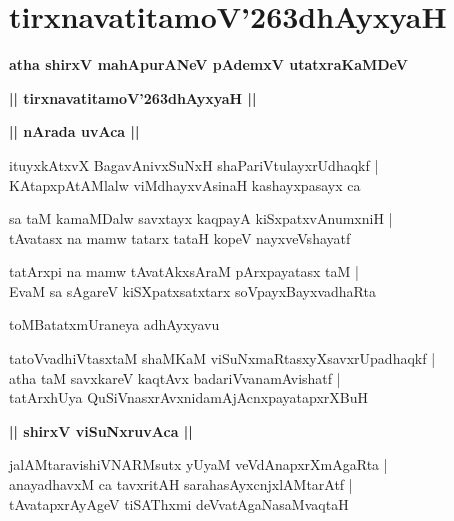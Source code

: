 \documentclass[twoside,12pt,openright]{book}
\def\S{\char'263}
\newcounter{shloka}[chapter]
\def\uvaca#1{\centerline{{\large\textbf{#1}}}}
\begin{document}
\chapter{tirxnavatitamoV\S dhAyxyaH}

\begin{center}
{\LARGE\bfseries atha shirxV mahApurANeV pAdemxV utatxraKaMDeV}
\end{center}

\begin{center}
{\LARGE\bfseries || tirxnavatitamoV\S dhAyxyaH || }
\end{center}

\uvaca{|| nArada uvAca ||}

\begin{shloka}%
ituyxkAtxvX BagavAnivxSuNxH shaPariVtulayxrUdhaqkf |\\
KAtapxpAtAMlalw viMdhayxvAsinaH kashayxpasayx ca 
\end{shloka}

\begin{shloka}%
sa taM kamaMDalw savxtayx kaqpayA kiSxpatxvAnumxniH |\\
tAvatasx na mamw tatarx tataH kopeV nayxveVshayatf
\end{shloka}

\begin{shloka}%
tatArxpi na mamw tAvatAkxsAraM pArxpayatasx taM |\\
EvaM sa sAgareV kiSXpatxsatxtarx soVpayxBayxvadhaRta
\end{shloka}

\begin{center}
toMBatatxmUraneya adhAyxyavu
\end{center}

\begin{shloka}%
tatoVvadhiVtasxtaM shaMKaM viSuNxmaRtasxyXsavxrUpadhaqkf |\\
atha taM savxkareV kaqtAvx badariVvanamAvishatf |\\
tatArxhUya QuSiVnasxrAvxnidamAjAcnxpayatapxrXBuH 
\end{shloka}

\uvaca{|| shirxV viSuNxruvAca ||}

\begin{shloka}%
jalAMtaravishiVNARMsutx yUyaM veVdAnapxrXmAgaRta |\\
anayadhavxM ca tavxritAH sarahasAyxcnjxlAMtarAtf |\\
tAvatapxrAyAgeV tiSAThxmi deVvatAgaNasaMvaqtaH 
\end{shloka}
\end{document}
